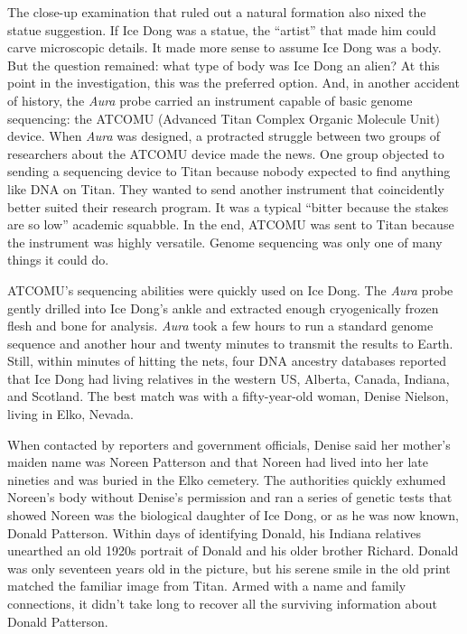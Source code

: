 The close-up examination that ruled out a natural formation also nixed
the statue suggestion. If Ice Dong was a statue, the ``artist'' that
made him could carve microscopic details. It made more sense to assume
Ice Dong was a body. But the question remained: what type of body was
Ice Dong an alien? At this point in the investigation, this was the
preferred option. And, in another accident of history, the \emph{Aura}
probe carried an instrument capable of basic genome sequencing: the
ATCOMU (Advanced Titan Complex Organic Molecule Unit) device. When
\emph{Aura} was designed, a protracted struggle between two groups of
researchers about the ATCOMU device made the news. One group objected to
sending a sequencing device to Titan because nobody expected to find
anything like DNA on Titan. They wanted to send another instrument that
coincidently better suited their research program. It was a typical
``bitter because the stakes are so low'' academic squabble. In the end,
ATCOMU was sent to Titan because the instrument was highly versatile.
Genome sequencing was only one of many things it could do.

ATCOMU's sequencing abilities were quickly used on Ice Dong. The
\emph{Aura} probe gently drilled into Ice Dong's ankle and extracted
enough cryogenically frozen flesh and bone for analysis. \emph{Aura}
took a few hours to run a standard genome sequence and another hour and
twenty minutes to transmit the results to Earth. Still, within minutes
of hitting the nets, four DNA ancestry databases reported that Ice Dong
had living relatives in the western US, Alberta, Canada, Indiana, and
Scotland. The best match was with a fifty-year-old woman, Denise
Nielson, living in Elko, Nevada.

When contacted by reporters and government officials, Denise said her
mother's maiden name was Noreen Patterson and that Noreen had lived into
her late nineties and was buried in the Elko cemetery. The authorities
quickly exhumed Noreen's body without Denise's permission and ran a
series of genetic tests that showed Noreen was the biological daughter
of Ice Dong, or as he was now known, Donald Patterson. Within days of
identifying Donald, his Indiana relatives unearthed an old 1920s
portrait of Donald and his older brother Richard. Donald was only
seventeen years old in the picture, but his serene smile in the old
print matched the familiar image from Titan. Armed with a name and
family connections, it didn't take long to recover all the surviving
information about Donald Patterson.

